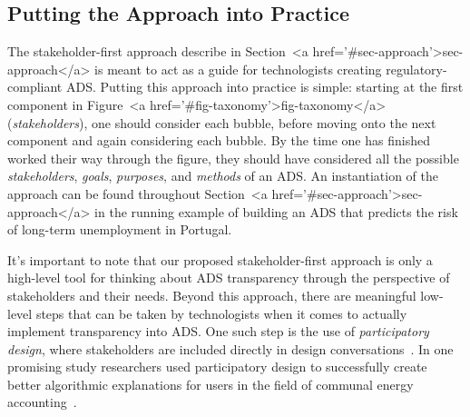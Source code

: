 \subsection{Putting the Approach into Practice}
The stakeholder-first approach describe in Section~<a href='#sec-approach'>sec-approach</a> is meant to act as a guide for technologists creating regulatory-compliant ADS. Putting this approach into practice is simple: starting at the first component in Figure~<a href='#fig-taxonomy'>fig-taxonomy</a> (\emph{stakeholders}), one should consider each bubble, before moving onto the next component and again considering each bubble. By the time one has finished worked their way through the figure, they should have considered all the possible \emph{stakeholders}, \emph{goals}, \emph{purposes}, and \emph{methods} of an ADS. An instantiation of the approach can be found throughout Section~<a href='#sec-approach'>sec-approach</a> in the running example of building an ADS that predicts the risk of long-term unemployment in Portugal.

It's important to note that our proposed stakeholder-first approach is only a high-level tool for thinking about ADS transparency through the perspective of stakeholders and their needs. Beyond this approach, there are meaningful low-level steps that can be taken by technologists when it comes to actually implement transparency into ADS. One such step is the use of \emph{participatory design}, where stakeholders are included directly in design conversations~\cite{eiband2018bringing, cech2021tackling, aizenberg2020designing, gupta2020participatory}. In one promising study researchers used participatory design to successfully create better algorithmic explanations for users in the field of communal energy accounting~\cite{cech2021tackling}.





